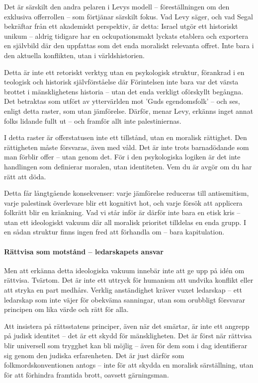 Det är särskilt den andra pelaren i Levys modell – föreställningen om den exklusiva offerrollen – som förtjänar särskilt fokus. Vad Levy säger, och vad Segal bekräftar från ett akademiskt perspektiv, är detta: Israel utgör ett historiskt unikum – aldrig tidigare har en ockupationsmakt lyckats etablera och exportera en självbild där den uppfattas som det enda moraliskt relevanta offret. Inte bara i den aktuella konflikten, utan i världshistorien.

Detta är inte ett retoriskt verktyg utan en psykologisk struktur, förankrad i en teologisk och historisk självförståelse där Förintelsen inte bara var det värsta brottet i mänsklighetens historia – utan det enda verkligt oförskyllt begångna. Det betraktas som utfört av yttervärlden mot 'Guds egendomsfolk' – och ses, enligt detta raster, som utan jämförelse. Därför, menar Levy, erkänns inget annat folks lidande fullt ut – och framför allt inte palestiniernas.

I detta raster är offerstatusen inte ett tillstånd, utan en moralisk rättighet. Den rättigheten måste försvaras, även med våld. Det är inte trots barnadödande som man förblir offer – utan genom det. För i den psykologiska logiken är det inte handlingen som definierar moralen, utan identiteten. Vem du är avgör om du har rätt att döda.

Detta får långtgående konsekvenser: varje jämförelse reduceras till antisemitism, varje palestinsk överlevare blir ett kognitivt hot, och varje försök att applicera folkrätt blir en kränkning. Vad vi står inför är därför inte bara en etisk kris – utan ett ideologiskt vakuum där all moralisk prioritet tilldelas en enda grupp. I en sådan struktur finns ingen fred att förhandla om – bara kapitulation.

\medskip
\paragraph*{Rättvisa som motstånd – ledarskapets ansvar}

Men att erkänna detta ideologiska vakuum innebär inte att ge upp på idén om rättvisa. Tvärtom. Det är inte ett uttryck för humanism att undvika konflikt eller att stryka en part medhårs. Verklig anständighet kräver vuxet ledarskap – ett ledarskap som inte väjer för obekväma sanningar, utan som orubbligt försvarar principen om lika värde och rätt för alla.

Att insistera på rättsstatens principer, även när det smärtar, är inte ett angrepp på judisk identitet – det är ett skydd för mänskligheten. Det är först när rättvisa blir universell som trygghet kan bli möjlig – även för dem som i dag identifierar sig genom den judiska erfarenheten. Det är just därför som folkmordskonventionen antogs – inte för att skydda en moralisk särställning, utan för att förhindra framtida brott, oavsett gärningsman.



